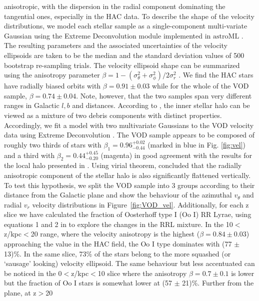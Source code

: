 \documentclass[fleqn,usenatbib]{mnras}
\begin{document}
anisotropic, with the dispersion in the radial component dominating
the tangential ones, especially in the HAC data. To describe the shape
of the velocity distributions, we model each stellar sample as a
single-component multi-variate Gaussian using the Extreme
Deconvolution module implemented in $\mathrm{astroML}$
\citep{astroML}. The resulting parameters and the associated
uncertainties of the velocity ellipsoids are taken to be the median
and the standard deviation values of 500 bootstrap re-sampling trials.
The velocity ellipsoid shape can be summarized using the anisotropy
parameter $\beta=1-(\sigma^2_{\theta}+\sigma^2_{\phi})/2\sigma^2_r$
\citep[see][]{Binney2008}. We find the HAC stars have radially biased
orbits with $\beta = 0.91 \pm 0.03$ while for the whole of the VOD
sample, $\beta = 0.74 \pm 0.04$. Note, however, that the two samples
span very different ranges in Galactic $l,b$ and distances. According
to \citet{Belokurov2018}, the inner stellar halo can be viewed as a
mixture of two debris components with distinct
properties. Accordingly, we fit a model with two multivariate
Gaussians to the VOD velocity data using Extreme Deconvolution
\citep[see][]{ED}. The VOD sample appears to be composed of roughly
two thirds of stars with $\beta_{1}= 0.96^{+0.02}_{-0.44}$ (marked in
blue in Fig. \ref{fig:vel}) and a third with
$\beta_{2}=0.44^{+0.45}_{-0.20}$ (magenta) in good agreement with the
results for the local halo presented in \citet{Belokurov2018}.
%
Using virial theorem, \citet{actionhalo} concluded that the radially
anisotropic component of the stellar halo is also significantly
flattened vertically. To test this hypothesis, we split the VOD sample
into 3 groups according to their distance from the Galactic plane and
show the behaviour of the azimuthal $v_{\theta}$ and radial $v_{r}$
velocity distributions in Figure~\ref{fig:VOD_vel}. Additionally, for
each z slice we have calculated the fraction of Oosterhoff type I (Oo
I) RR Lyrae, using equations 1 and 2 in \citet{Be2018} to explore the
changes in the RRL mixture. In the 10$<$z/kpc$<$20 range, where the
velocity anisotropy is the highest ($\beta = 0.84 \pm 0.03$)
approaching the value in the HAC field, the Oo I type dominates with 
(77 $\pm$ 13)\%. In the same slice, 73\% of the stars belong to the more
squashed (or `sausage' looking) velocity ellipsoid. The same behaviour
but less accentuated can be noticed in the 0$<$z/kpc$<$10 slice where
the anisotropy $\beta = 0.7 \pm 0.1$ is lower but the fraction of Oo I
stars is somewhat lower at (57 $\pm$ 21)\%. Further from the plane, at z$>$20
\end{document}
